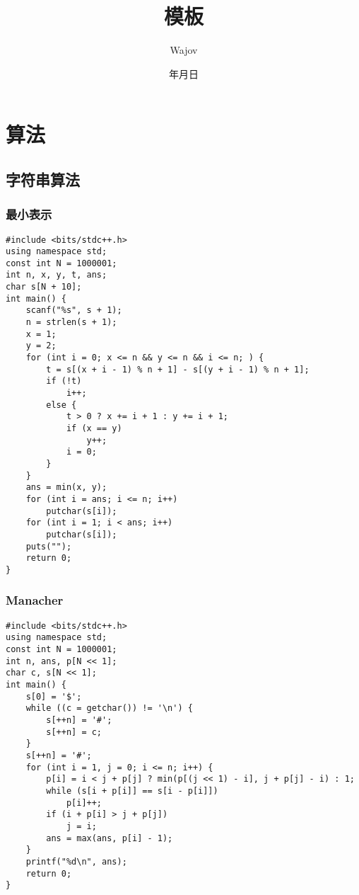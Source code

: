 \documentclass[a4paper]{article}
\begin{document}
\title{模板}
\author{Wajov}
\date{\number\year 年\number\month 月\number\day 日}
\renewcommand{\contentsname}{目录}
\maketitle
{}
\tableofcontents
\newpage
{}
\newfontfamily{}
\section{算法}
\subsection{字符串算法}
\subsubsection{最小表示}
\begin{lstlisting}
#include <bits/stdc++.h>
using namespace std;
const int N = 1000001;
int n, x, y, t, ans;
char s[N + 10];
int main() {
    scanf("%s", s + 1);
    n = strlen(s + 1);
    x = 1;
    y = 2;
    for (int i = 0; x <= n && y <= n && i <= n; ) {
        t = s[(x + i - 1) % n + 1] - s[(y + i - 1) % n + 1];
        if (!t)
            i++;
        else {
            t > 0 ? x += i + 1 : y += i + 1;
            if (x == y)
                y++;
            i = 0;
        }
    }
    ans = min(x, y);
    for (int i = ans; i <= n; i++)
        putchar(s[i]);
    for (int i = 1; i < ans; i++)
        putchar(s[i]);
    puts("");
    return 0;
}
\end{lstlisting}
\subsubsection{Manacher}
\begin{lstlisting}
#include <bits/stdc++.h>
using namespace std;
const int N = 1000001;
int n, ans, p[N << 1];
char c, s[N << 1];
int main() {
    s[0] = '$';
    while ((c = getchar()) != '\n') {
        s[++n] = '#';
        s[++n] = c;
    }
    s[++n] = '#';
    for (int i = 1, j = 0; i <= n; i++) {
        p[i] = i < j + p[j] ? min(p[(j << 1) - i], j + p[j] - i) : 1;
        while (s[i + p[i]] == s[i - p[i]])
            p[i]++;
        if (i + p[i] > j + p[j])
            j = i;
        ans = max(ans, p[i] - 1);
    }
    printf("%d\n", ans);
    return 0;
}
\end{lstlisting}
\end{document}
